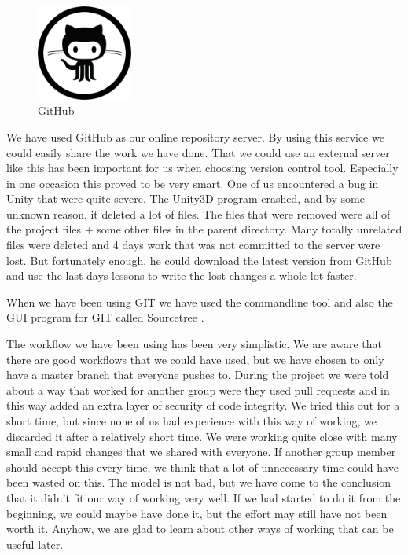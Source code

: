 \begin{figure}
	\capstart
	\centering
	\vspace{-10pt}
	\includegraphics[width=0.28\textwidth]{images/github}
	\vspace{-5pt}
	\caption[{G}it{H}ub logo]{{G}it{H}ub}
	\label{fig:github}
	\vspace{-10pt}
\end{figure}

We have used GitHub \cite{GitHub} as our online repository server. By using
this service we could easily share the work we have done. That we could use
an external server like this has been important for us when choosing version
control tool. Especially in one occasion this proved to be very smart. One of
us encountered a bug in Unity that were quite severe. The Unity3D program
crashed, and by some unknown reason, it deleted a lot of files. The files that
were removed were all of the project files + some other files in the parent
directory. Many totally unrelated files were deleted and 4 days work that was
not committed to the server were lost. But fortunately enough, he could
download the latest version from GitHub and use the last days lessons to write
the lost changes a whole lot faster.

When we have been using GIT we have used the commandline tool and also the GUI
program for GIT called Sourcetree \cite{SourceTree}.

The workflow we have been using has been very simplistic. We are aware that
there are good workflows that we could have used, but we have chosen to only
have a master branch that everyone pushes to. During the project we were told
about a way that worked for another group were they used pull requests and in
this way added an extra layer of security of code integrity. We tried this out
for a short time, but since none of us had experience with this way of working,
we discarded it after a relatively short time. We were working quite close with
many small and rapid changes that we shared with everyone. If another group
member should accept this every time, we think that a lot of unnecessary time
could have been wasted on this. The model is not bad, but we have come to the
conclusion that it didn't fit our way of working very well. If we had started 
to do it from the beginning, we could maybe have done it, but the effort may
still have not been worth it. Anyhow, we are glad to learn about other ways of
working that can be useful later.